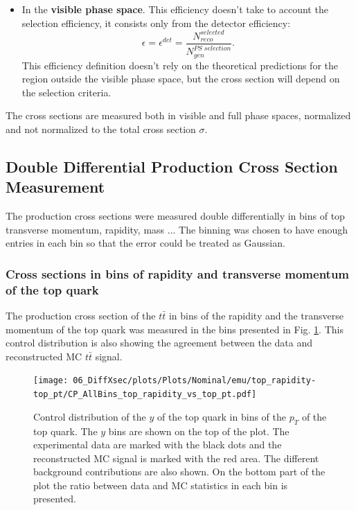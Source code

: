\begin{itemize}
 \item In the \textbf{visible phase space}. This efficiency doesn't take to account the selection efficiency, it consists only from the detector efficiency:
 \begin{equation}
  \epsilon = \epsilon^{det} = \frac{N^{selected}_{reco}}{N^{PS\;selection}_{gen}}.
 \end{equation}
 This efficiency definition doesn't rely on the theoretical predictions for the region outside the visible phase space, but the cross section will depend on
 the selection criteria.
\end{itemize}

The cross sections are measured both in visible and full phase spaces, normalized and not normalized to the total cross section $\sigma$. 


\subsection{Double Differential Production Cross Section Measurement}

The production cross sections were measured double differentially in bins of top transverse momentum, rapidity, mass ...
The binning was chosen to have enough entries in each bin so that the error could be treated as Gaussian.


\subsubsection{Cross sections in bins of rapidity and transverse momentum of the top quark}

The production cross section of the $t\bar{t}$ in bins of the rapidity and the transverse momentum of the top quark was
measured in the bins presented in Fig. \ref{fig:CP_2D_y_pt}. This control distribution is also showing the agreement between 
the data and reconstructed MC $t\bar{t}$ signal.

\begin{figure}[t]
  \centering
  \texttt{[image: 06\_DiffXsec/plots/Plots/Nominal/emu/top\_rapidity-top\_pt/CP\_AllBins\_top\_rapidity\_vs\_top\_pt.pdf]}
  \caption{Control distribution of the $y$ of the top quark in bins of the $p_{T}$ of the top quark. The $y$ bins are shown on the top 
  of the plot. The experimental data are marked with the black dots and the reconstructed MC signal is marked with the red area. The 
  different background contributions are also shown. On the bottom part of the plot the ratio between data and MC statistics in each bin
  is presented.}
  \label{fig:CP_2D_y_pt}
\end{figure}

